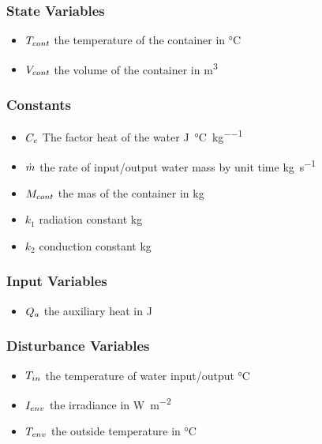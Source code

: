 \documentclass[a4paper,12pt,twoside,openright]{book}
\begin{document}
\vspace{5mm}

\subsubsection{State Variables}

\begin{itemize}
\item
  $T_{cont}$ the temperature of the container in \si{\degreeCelsius}
\item
  $V_{cont}$ the volume of the container in \si{\metre^3}

\end{itemize}

\subsubsection{Constants}
\begin{itemize}
\item
  $C_e$ The factor heat of the water \si{\joule\per\degreeCelsius\per\kilogram}
\item
  $\dot{m}$ the rate of input/output water mass by unit time \si{\kilogram\per\second}
\item
  $M_{cont}$ the mas of the container in \si{\kilogram}
\item
  $k_1$ radiation constant  \si{\kilogram}
\item
  $k_2$ conduction constant \si{\kilogram}

\end{itemize}

\subsubsection{Input Variables}
\begin{itemize}
\item
  $Q_{a}$ the auxiliary heat in \si{\joule}


\end{itemize}

\subsubsection{Disturbance Variables}
\begin{itemize}
\item 
  $T_{in}$ the temperature of water input/output \si{\degreeCelsius}
\item
  $I_{env}$ the irradiance in \si{\watt\per\square\metre}
\item
  $T_{env}$ the outside temperature in \si{\degreeCelsius}
\end{itemize}
\end{document}
